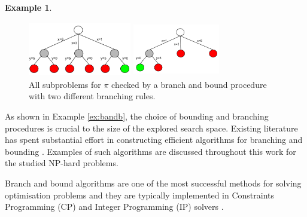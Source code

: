 \documentclass{mprop}
\theoremstyle{definition}
\newtheorem{example}{Example}
\begin{document}
\begin{example}
\begin{figure}
\centering
\begin{minipage}{.5\textwidth}
\centering
\includegraphics[width=4.5cm, height=2.4cm]{images/fullsearch.png}
\end{minipage}%
\begin{minipage}{.5\textwidth}
\centering
\includegraphics[width=3.8cm, height=2.4cm]{images/smallsearch.png}
\end{minipage}
\caption{All subproblems for $\pi$ checked by a branch and bound procedure with two different branching rules.}
\label{fig:bandb}
\end{figure}
\end{example}

As shown in Example \ref{ex:bandb}, the choice of bounding and branching procedures is crucial to the size of the explored search space. Existing literature has spent substantial effort in constructing efficient algorithms for branching and bounding \citep{Little63,Dantzig54, HeldK70}. Examples of such algorithms are discussed throughout this work for the studied NP-hard problems.


Branch and bound algorithms are one of the most successful methods for solving optimisation problems \citep{Christofides81} and they are typically implemented in Constraints Programming (CP) and Integer Programming (IP) solvers \citep{Leyffer01,Quesada92}.
\end{document}
